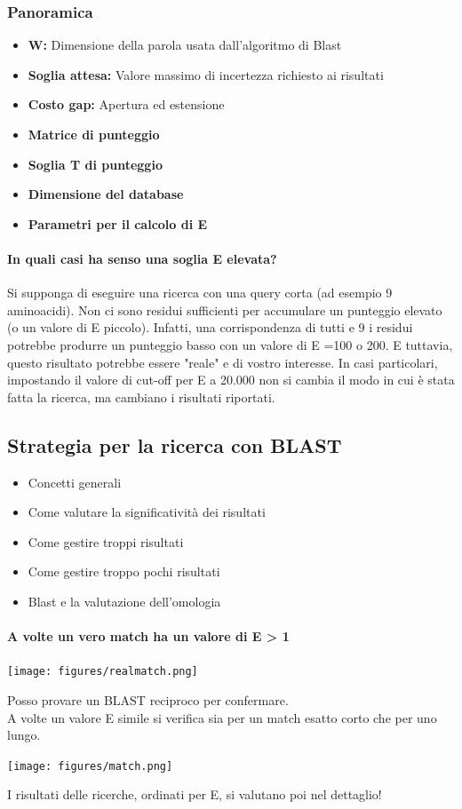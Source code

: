 \documentclass{article}
\begin{document}
\subsubsection{Panoramica}
\begin{itemize}
    \item \textbf{W:} Dimensione della parola usata dall'algoritmo di Blast
    \item \textbf{Soglia attesa:} Valore massimo di incertezza richiesto ai risultati
    \item \textbf{Costo gap:} Apertura ed estensione
    \item \textbf{Matrice di punteggio}
    \item \textbf{Soglia T di punteggio}
    \item \textbf{Dimensione del database}
    \item \textbf{Parametri per il calcolo di E}
\end{itemize}
\paragraph{In quali casi ha senso una soglia E elevata?}
Si supponga di eseguire una ricerca con una query corta
(ad esempio 9 aminoacidi). Non ci sono residui sufficienti per
accumulare un punteggio elevato (o un valore di E piccolo).
Infatti, una corrispondenza di tutti e 9 i residui potrebbe
produrre un punteggio basso con un valore di E =100 o 200.
E tuttavia, questo risultato potrebbe essere "reale" e di vostro
interesse.
In casi particolari, impostando il valore di cut-off per E a
20.000 non si cambia il modo in cui è stata fatta la ricerca,
ma cambiano i risultati riportati.
\subsection{Strategia per la ricerca con BLAST}
\begin{itemize}
    \item Concetti generali
    \item Come valutare la significatività dei risultati
    \item Come gestire troppi risultati
    \item Come gestire troppo pochi risultati
    \item Blast e la valutazione dell'omologia
\end{itemize}
\paragraph{A volte un vero match ha un valore di E > 1}
\begin{center}
    \texttt{[image: figures/realmatch.png]}
\end{center}
Posso provare un BLAST reciproco per confermare.\\
A volte un valore E simile si verifica sia per un match esatto corto che per uno lungo.
\begin{center}
    \texttt{[image: figures/match.png]}
\end{center}
I risultati delle ricerche, ordinati per E, si valutano poi nel dettaglio!
\end{document}
